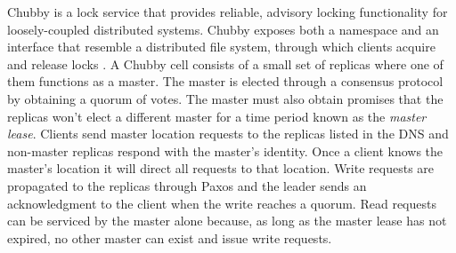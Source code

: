 Chubby is a lock service that provides reliable, advisory locking functionality for loosely-coupled distributed systems. Chubby exposes both a namespace and an interface that resemble a distributed file system, through which clients acquire and release locks \cite{Burrows2006}. A Chubby cell consists of a small set of replicas where one of them functions as a master. The master is elected through a consensus protocol by obtaining a quorum of votes. The master must also obtain promises that the replicas won't elect a different master for a time period known as the \textit{master lease}. Clients send master location requests to the replicas listed in the DNS and non-master replicas respond with the master's identity. Once a client knows the master's location it will direct all requests to that location. Write requests are propagated to the replicas through Paxos and the leader sends an acknowledgment to the client when the write reaches a quorum. Read requests can be serviced by the master alone because, as long as the master lease has not expired, no other master can exist and issue write requests.

